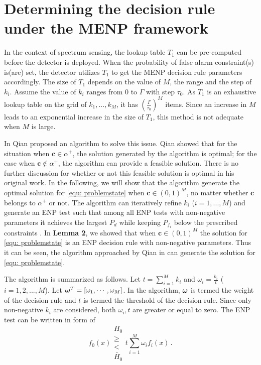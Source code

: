 
\section{Determining the decision rule under the MENP framework}
In the context of spectrum sensing, the lookup table $T_1$ can be pre-computed  before the detector is deployed. When the probability of false alarm constraint(s) is(are) set, the detector utilizes $T_1$ to get the MENP decision  rule parameters accordingly. The size of $T_1$ depends on the value of $M$, the range and the step of $k_i$.  Assume the value of $k_i$ ranges from $0$ to $\Gamma$ with step $\tau_0$. As $T_1$ is an exhaustive lookup table on the grid of $k_1, ..., k_M$, it has $(\frac{\Gamma}{\tau_0})^M$ items. Since an increase in $M$ leads to an exponential increase in the size of $T_1$, this method is not adequate when $M$ is large. 

In \cite{zhang1999design, zhang2000efficient} Qian proposed an algorithm to solve this issue. 
 Qian showed that for the situation when $\mathbf{c} \in \alpha^+$, the solution generated by the algorithm is optimal; 
 for the case when $\mathbf{c} \notin \alpha^+$, the algorithm can provide a feasible solution. There is no further discussion for whether or not this feasible solution is optimal in his original work.  
In the following, we will show that the algorithm generate the optimal solution for \eqref{equ: problemstate} when $\mathbf{c} \in (0, 1)^M$, no matter whether $\mathbf{c}$ belongs to $\alpha^+$ or not. 
The algorithm can iteratively refine $k_i$ ($i=1, ..., M$) and generate an ENP test  such that among all ENP tests with non-negative parameters it achieves the largest $P_d$ while keeping $P_{f_i}$ below the prescribed constraints \cite{zhang1999design, zhang2000efficient}. In \textbf{Lemma 2}, we showed that when $\mathbf{c} \in (0, 1)^M$ the solution for \eqref{equ: problemstate} is an ENP decision rule with non-negative parameters. Thus it can be seen, the  algorithm approached by Qian in \cite{zhang1999design, zhang2000efficient} can generate the solution for \eqref{equ: problemstate}.

The algorithm is summarized as follows. Let $t = \sum_{i=1}^{M}k_i$ and $\omega_i = \frac{k_i}{t}$ ($i=1, 2, ..., M$).
Let $\boldsymbol{\omega}^T = [\omega_1, \cdots, \omega_M]$. 
In the algorithm, $\boldsymbol{\omega}$ is termed the weight of the decision rule and $t$ is termed the threshold of the decision rule. Since only non-negative $k_i$ are considered, both $\omega_i, t$ are greater or equal to zero. The ENP test can be written in form of 
\begin{equation}
\label{qian dec}
f_0(x) \substack{H_0 \\ \geq \\ < \\ \bar{H}_0} t\sum_{i=1}^{M}\omega_if_i(x)\,.
\end{equation}

